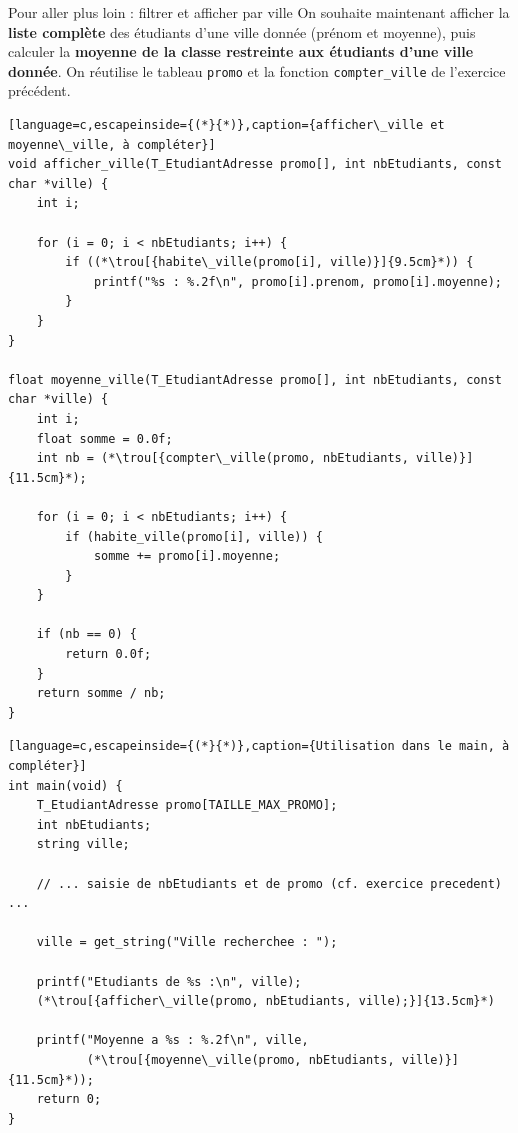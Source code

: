 
\begin{UPSTIexercice}{Pour aller plus loin : filtrer et afficher par ville}
    On souhaite maintenant afficher la \textbf{liste complète} des étudiants d'une ville donnée
    (prénom et moyenne), puis calculer la \textbf{moyenne de la classe restreinte aux étudiants
    d'une ville donnée}. On réutilise le tableau \texttt{promo} et la fonction \texttt{compter\_ville}
    de l'exercice précédent.


    \begin{lstlisting}[language=c,escapeinside={(*}{*)},caption={afficher\_ville et moyenne\_ville, à compléter}]
void afficher_ville(T_EtudiantAdresse promo[], int nbEtudiants, const char *ville) {
    int i;

    for (i = 0; i < nbEtudiants; i++) {
        if ((*\trou[{habite\_ville(promo[i], ville)}]{9.5cm}*)) {
            printf("%s : %.2f\n", promo[i].prenom, promo[i].moyenne);
        }
    }
}

float moyenne_ville(T_EtudiantAdresse promo[], int nbEtudiants, const char *ville) {
    int i;
    float somme = 0.0f;
    int nb = (*\trou[{compter\_ville(promo, nbEtudiants, ville)}]{11.5cm}*);

    for (i = 0; i < nbEtudiants; i++) {
        if (habite_ville(promo[i], ville)) {
            somme += promo[i].moyenne;
        }
    }

    if (nb == 0) {
        return 0.0f;
    }
    return somme / nb;
}
\end{lstlisting}


    \begin{lstlisting}[language=c,escapeinside={(*}{*)},caption={Utilisation dans le main, à compléter}]
int main(void) {
    T_EtudiantAdresse promo[TAILLE_MAX_PROMO];
    int nbEtudiants;
    string ville;

    // ... saisie de nbEtudiants et de promo (cf. exercice precedent) ...

    ville = get_string("Ville recherchee : ");

    printf("Etudiants de %s :\n", ville);
    (*\trou[{afficher\_ville(promo, nbEtudiants, ville);}]{13.5cm}*)

    printf("Moyenne a %s : %.2f\n", ville,
           (*\trou[{moyenne\_ville(promo, nbEtudiants, ville)}]{11.5cm}*));
    return 0;
}
\end{lstlisting}
\end{UPSTIexercice}
